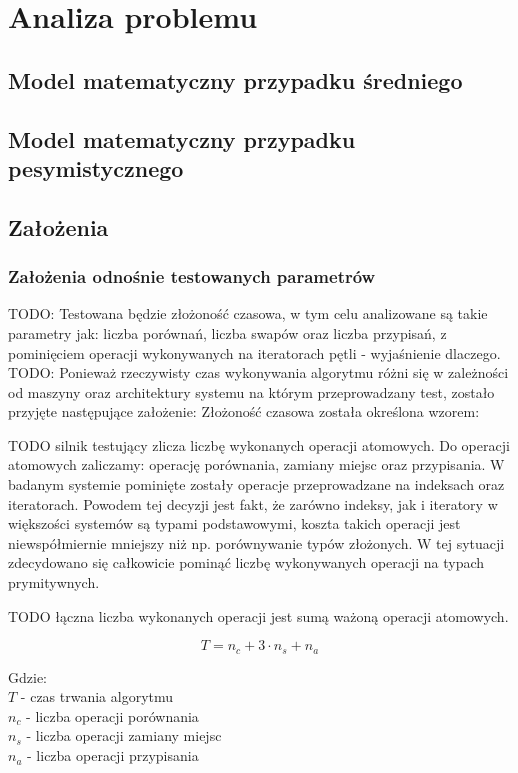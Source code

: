 \chapter{Analiza problemu}

\section{Model matematyczny przypadku średniego}

\section{Model matematyczny przypadku pesymistycznego}

\section{Założenia}

\subsection{Założenia odnośnie testowanych parametrów}
TODO: Testowana będzie złożoność czasowa, w tym celu analizowane są takie parametry jak: liczba porównań,
liczba swapów oraz liczba przypisań, z pominięciem operacji wykonywanych na iteratorach pętli -
wyjaśnienie dlaczego.\\

TODO: Ponieważ rzeczywisty czas wykonywania algorytmu różni się w zależności od maszyny oraz architektury systemu
na którym przeprowadzany test, zostało przyjęte następujące założenie:
Złożoność czasowa została określona wzorem:

TODO silnik testujący zlicza liczbę wykonanych operacji atomowych. Do operacji atomowych zaliczamy: operację porównania, zamiany miejsc oraz przypisania. W badanym systemie pominięte zostały operacje przeprowadzane na indeksach oraz iteratorach. Powodem tej decyzji jest fakt, że zarówno indeksy, jak i iteratory w większości systemów są typami podstawowymi, koszta takich operacji jest niewspółmiernie mniejszy niż np. porównywanie typów złożonych. W tej sytuacji zdecydowano się całkowicie pominąć liczbę wykonywanych operacji na typach prymitywnych.

TODO łączna liczba wykonanych operacji jest sumą ważoną operacji atomowych.

\boldmath$$T = n_c + 3 \cdot n_s + n_a $$

Gdzie:\\
\boldmath$T$ - czas trwania algorytmu\\
$n_c$ - liczba operacji porównania\\
$n_s$ - liczba operacji zamiany miejsc\\
$n_a$ - liczba operacji przypisania\\


